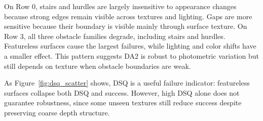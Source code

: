 On Row 0, stairs and hurdles are largely insensitive to appearance
changes because strong edges remain visible across textures and
lighting.  Gaps are more sensitive because their boundary is visible
mainly through surface texture. On Row 3, all three obstacle families degrade, including
stairs and hurdles.  Featureless surfaces cause the largest failures,
while lighting and color shifts have a smaller effect.  This pattern
suggests DA2 is robust to photometric variation but still depends on
texture when obstacle boundaries are weak.

As Figure~\ref{fig:dsq_scatter} shows, DSQ is a useful failure
indicator: featureless surfaces collapse both DSQ and success.
However, high DSQ alone does not guarantee robustness, since some
unseen textures still reduce success despite preserving coarse depth
structure.
